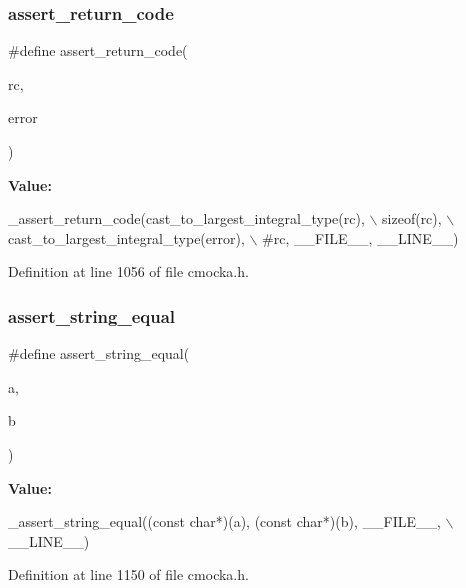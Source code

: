 \subsubsection{\texorpdfstring{assert\+\_\+return\+\_\+code}{assert\_return\_code}}
{\footnotesize\ttfamily \#define assert\+\_\+return\+\_\+code(\begin{DoxyParamCaption}\item[{}]{rc,  }\item[{}]{error }\end{DoxyParamCaption})}

{\bfseries Value\+:}
\begin{DoxyCode}
\_assert\_return\_code(cast\_to\_largest\_integral\_type(rc), \(\backslash\)
                        \textcolor{keyword}{sizeof}(rc), \(\backslash\)
                        cast\_to\_largest\_integral\_type(error), \(\backslash\)
                        #rc, \_\_FILE\_\_, \_\_LINE\_\_)
\end{DoxyCode}


Definition at line 1056 of file cmocka.\+h.

\mbox{\label{group__cmocka__asserts_ga30969b834c48829d76ec92c21aa9941c}} 
\subsubsection{\texorpdfstring{assert\+\_\+string\+\_\+equal}{assert\_string\_equal}}
{\footnotesize\ttfamily \#define assert\+\_\+string\+\_\+equal(\begin{DoxyParamCaption}\item[{}]{a,  }\item[{}]{b }\end{DoxyParamCaption})}

{\bfseries Value\+:}
\begin{DoxyCode}
\_assert\_string\_equal((\textcolor{keyword}{const} \textcolor{keywordtype}{char}*)(a), (\textcolor{keyword}{const} \textcolor{keywordtype}{char}*)(b), \_\_FILE\_\_, \(\backslash\)
                         \_\_LINE\_\_)
\end{DoxyCode}


Definition at line 1150 of file cmocka.\+h.

\mbox{\label{group__cmocka__asserts_ga1779f2c99e681290d4d02d197c00e06c}} 
